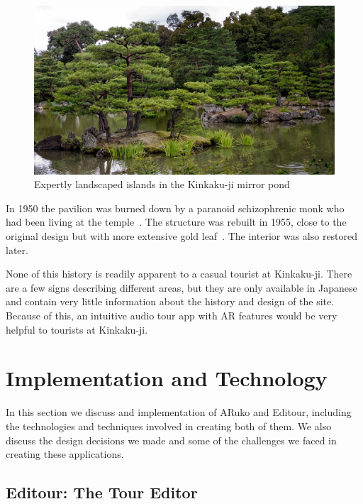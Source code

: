 \documentclass[a4paper, 10pt, american, titlepage]{article}
\begin{document}
\begin{figure}[h]
	\centering
	\includegraphics[width=\textwidth]{kinkakuji-grounds.jpg}
    \caption[Expertly landscaped islands in the Kinkaku-ji mirror pond]{Expertly
		landscaped islands in the Kinkaku-ji mirror pond~\autocite{desousa2014}}
	\label{fig:kinkakujiGrounds}
\end{figure}

In 1950 the pavilion was burned down by a paranoid schizophrenic monk who had
been living at the temple~\autocite{borowitz2005}. The structure was rebuilt in
1955, close to the original design but with more extensive gold
leaf~\autocite{bornoff2000}. The interior was also restored later.

None of this history is readily apparent to a casual tourist at Kinkaku-ji.
There are a few signs describing different areas, but they are only available in
Japanese and contain very little information about the history and design of the
site. Because of this, an intuitive audio tour app with AR features would be
very helpful to tourists at Kinkaku-ji.

\clearpage

\section{Implementation and Technology}
\label{sec:implementationAndTechnology}

In this section we discuss and implementation of ARuko and Editour, including
the technologies and techniques involved in creating both of them. We also
discuss the design decisions we made and some of the challenges we faced in
creating these applications.

\subsection{Editour: The Tour Editor}
\label{sec:editour}
\end{document}
